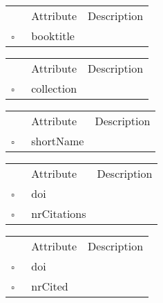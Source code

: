 \begin{table}
\caption{InBook  }

\begin{longtable}{llp{8cm}}
& Attribute & Description \\
$\square$\ & booktitle &  \\
\end{longtable}
\label{attr:InBook}
\end{table}

\begin{table}
\caption{InCollection  }

\begin{longtable}{llp{8cm}}
& Attribute & Description \\
$\square$\ & collection &  \\
\end{longtable}
\label{attr:InCollection}
\end{table}

\begin{table}
\caption{Journal  }

\begin{longtable}{llp{8cm}}
& Attribute & Description \\
$\square$\ & shortName &  \\
\end{longtable}
\label{attr:Journal}
\end{table}

\clearpage
\begin{table}
\caption{MissingCitedWork  }

\begin{longtable}{llp{8cm}}
& Attribute & Description \\
$\square$\ & doi &  \\
$\square$\ & nrCitations &  \\
\end{longtable}
\label{attr:MissingCitedWork}
\end{table}

\begin{table}
\caption{MissingCitingWork  }

\begin{longtable}{llp{8cm}}
& Attribute & Description \\
$\square$\ & doi &  \\
$\square$\ & nrCited &  \\
\end{longtable}
\label{attr:MissingCitingWork}
\end{table}

